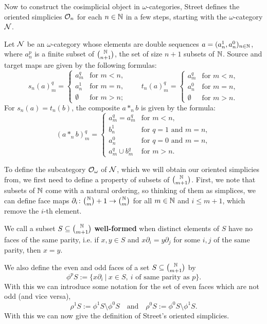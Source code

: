 \documentclass{article}
\begin{document}
Now to construct the cosimplicial object in $\omega$-categories, Street defines the oriented simplicies $\mathcal{O}_n$ for each $n\in\mathbb{N}$ in a few steps, starting with the $\omega$-category $\mathcal{N}$.

\begin{defn}
    Let $\mathcal{N}$ be an $\omega$-category whose elements are double sequences $a=(a_n^1,a_n^0)_{n\in\mathbb{N}}$, where $a_n^p$ is a finite subset of $\binom{\mathbb{N}}{n+1}$, the set of size $n+1$ subsets of $\mathbb{N}$. Source and target maps are given by the following formulas:
    $$ s_n(a)^q_m=\begin{cases}
        a_m^q & \text{for }m<n,\\
        a_n^1 & \text{for }m=n,\\
        \emptyset & \text{for }m>n;
    \end{cases}\qquad
    t_n(a)^q_m=\begin{cases}
        a_m^q & \text{for }m<n,\\
        a_n^0 & \text{for }m=n,\\
        \emptyset & \text{for }m>n.
    \end{cases} $$
    For $s_n(a)=t_n(b)$, the composite $a*_nb$ is given by the formula:
    $$ (a*_nb)_m^q=\begin{cases}
        a_m^q=a_m^q & \text{for }m<n,\\
        b_n^1 & \text{for }q=1\text{ and }m=n,\\
        a_n^0 & \text{for }q=0\text{ and }m=n,\\
        a_m^q\cup b_m^q & \text{for }m>n.
    \end{cases} $$
\end{defn}

To define the subcategory $\mathcal{O}_\omega$ of $\mathcal{N}$, which we will obtain our oriented simplicies from, we first need to define a property of subsets of $\binom{\mathbb{N}}{m+1}$. First, we note that subsets of $\mathbb{N}$ come with a natural ordering, so thinking of them as simplices, we can define face maps $\partial_i\colon{\binom{\mathbb{N}}m+1}\to{\binom{\mathbb{N}}m}$ for all $m\in\mathbb{N}$ and $i\leq m+1$, which remove the $i$-th element.

\begin{defn}
    We call a subset $S\subseteq{\binom{\mathbb{N}}{m+1}}$ \textbf{well-formed} when distinct elements of $S$ have no faces of the same parity, i.e. if $x,y\in S$ and $x\partial_i=y\partial_j$ for some $i,j$ of the same parity, then $x=y$.
\end{defn}

We also define the even and odd faces of a set $S\subseteq{\binom{\mathbb{N}}{m+1}}$ by
$$ \phi^pS:=\{x\partial_i\ |\ x\in S,\ i\text{ of same parity as }p\}. $$
With this we can introduce some notation for the set of even faces which are not odd (and vice versa),
$$ \rho^1S:=\phi^1S\setminus\phi^0S\quad\text{and}\quad\rho^0S:=\phi^0S\setminus\phi^1S. $$
With this we can now give the definition of Street's oriented simplicies.
\end{document}
